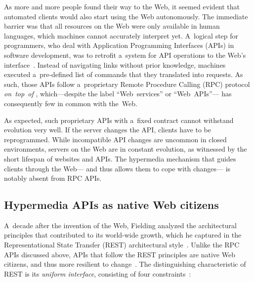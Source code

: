 As more and more people found their way to the Web,
it seemed evident that automated clients would also start using the Web autonomously.
The immediate barrier was that all resources on the Web
were only available in human languages,
which machines cannot accurately interpret yet.
A~logical step for programmers,
who deal with Application Programming Interfaces (APIs) in software development,
was to retrofit a~system for API operations
to the Web's \http interface~\cite{HTTP}.
Instead of navigating links without prior knowledge,
machines executed a~pre-defined list of commands
that they translated into \http requests.
As such, those APIs follow a~proprietary Remote Procedure Calling (RPC) protocol
\emph{on~top~of} \http,
which---despite the label \enquote{Web~services} or \enquote{Web~{APIs}}---%
has consequently few in common with the~Web.

As expected, such proprietary APIs with a~fixed contract
cannot withstand evolution very well.
If the server changes the API,
clients have to be reprogrammed.
While incompatible API changes are uncommon in closed environments,
servers on the Web are in constant evolution,
as witnessed by the short lifespan of websites and APIs.
The hypermedia mechanism that guides clients through the Web---%
and thus allows them to cope with changes---%
is notably absent from RPC APIs.

\subsection{Hypermedia APIs as native Web citizens}
\label{sec:RESTConstraints}
A~decade after the invention of the Web,
Fielding analyzed the architectural principles that contributed to its world-wide growth,
which he captured in the Representational State Transfer (REST) architectural style~\cite{REST}.
Unlike the RPC APIs discussed above,
APIs that follow the REST principles are native Web citizens,
and thus more resilient to change~\cite{verborgh_jod_2014}.
The distinguishing characteristic of REST is its \emph{uniform interface},
consisting of four constraints~\cite{REST}:

